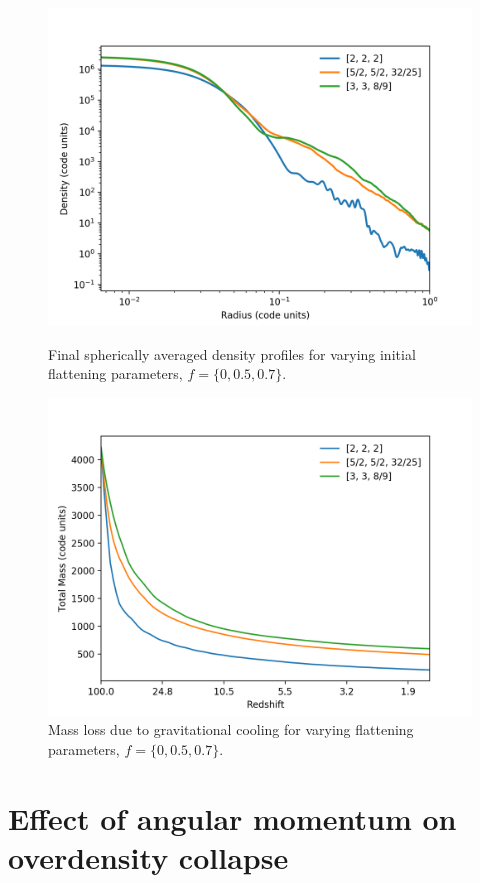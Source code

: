 \documentclass[a4paper,11pt]{article}
\begin{document}
\begin{figure}[!htb]
  \includegraphics[trim={1.6cm 0 0 0cm},scale=0.55]{final_profiles_flattening.png}
  \caption{Final spherically averaged density profiles for varying initial flattening parameters, $f = \{0, 0.5, 0.7\}$.}\label{fig:final_profiles_flattening}
\endminipage\hfill
{}
  \includegraphics[trim={1.5cm 0 1cm 0cm},scale=0.55]{mass_loss_flattening.png}
  \caption{Mass loss due to gravitational cooling for varying flattening parameters, $f = \{0, 0.5, 0.7\}$.}\label{fig:mass_loss_flattening}
\endminipage\hfill
\end{figure}

\section{Effect of angular momentum on overdensity collapse}\label{sec:rotation}
\end{document}
